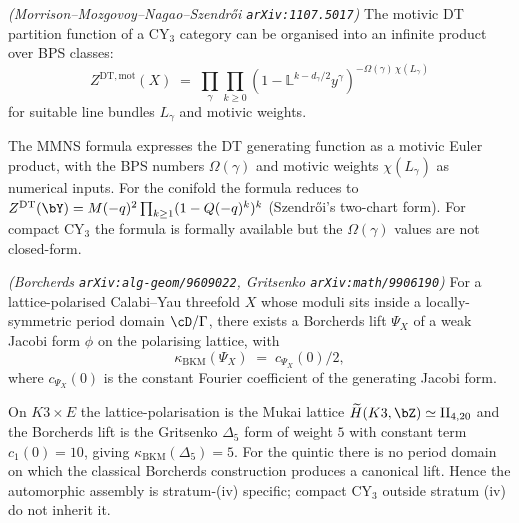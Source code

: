 \begin{proposition}
\label{prop:mmns-motivic}
\emph{(Morrison--Mozgovoy--Nagao--Szendrői
\texttt{arXiv:1107.5017})}
The motivic DT partition function of a CY$_3$ category can be organised
into an infinite product over BPS classes:
\[
 Z^{\mathrm{DT,mot}}(X) \;=\;
 \prod_{\gamma} \prod_{k \geq 0}
 \left(1 - \mathbb{L}^{k - d_\gamma/2} y^\gamma\right)^{-\Omega(\gamma)
 \,\chi(L_\gamma)}
\]
for suitable line bundles $L_\gamma$ and motivic weights.
\end{proposition}

The MMNS formula expresses the DT generating function as a motivic
Euler product, with the BPS numbers $\Omega(\gamma)$ and motivic
weights $\chi(L_\gamma)$ as numerical inputs. For the conifold the
formula reduces to $Z^{\mathrm{DT}}(\bY) = M(-q)^2 \prod_{k \geq 1}(1 -
Q(-q)^k)^k$ (Szendrői's two-chart form). For compact CY$_3$ the formula
is formally available but the $\Omega(\gamma)$ values are not
closed-form.

\begin{proposition}
\label{prop:borcherds-assembly}
\emph{(Borcherds \texttt{arXiv:alg-geom/9609022},
Gritsenko \texttt{arXiv:math/9906190})}
For a lattice-polarised Calabi--Yau threefold $X$ whose moduli sits
inside a locally-symmetric period domain $\cD / \Gamma$, there exists
a Borcherds lift $\Psi_X$ of a weak Jacobi form $\phi$ on the
polarising lattice, with
\[
 \kappa_{\mathrm{BKM}}(\Psi_X) \;=\; c_{\Psi_X}(0)/2,
\]
where $c_{\Psi_X}(0)$ is the constant Fourier coefficient of the
generating Jacobi form.
\end{proposition}

On $K3 \times E$ the lattice-polarisation is the Mukai lattice
$\widetilde H(K3, \bZ) \simeq \mathrm{II}_{4,20}$ and the Borcherds
lift is the Gritsenko $\Delta_5$ form of weight $5$ with constant term
$c_1(0) = 10$, giving $\kappa_{\mathrm{BKM}}(\Delta_5) = 5$. For the quintic
there is no period domain on which the classical Borcherds construction
produces a canonical lift. Hence the automorphic assembly is
stratum-(iv) specific; compact CY$_3$ outside stratum (iv) do not inherit
it.

